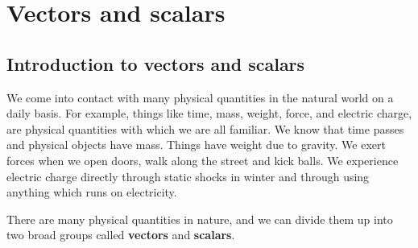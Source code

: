          \chapter{Vectors and scalars}\label{chap:vectors}
    \setcounter{figure}{1}
    \setcounter{subfigure}{1}
    \label{59e414b70efc194a27a122db47d06ce6}
         \section{Introduction to vectors and scalars}
    \nopagebreak
We come into contact with many physical quantities in the natural world on a daily basis. For example, things like time, mass, weight, force, and electric charge, are physical quantities with which we are all familiar. We know that time passes and physical objects have mass. Things have weight due to gravity. We exert forces when we open doors, walk along the street and kick balls. We experience electric charge directly through static shocks in winter and through using anything which runs on electricity. 

There are many physical quantities in nature, and we can divide them up into two broad groups called \textbf{vectors} and \textbf{scalars}.


